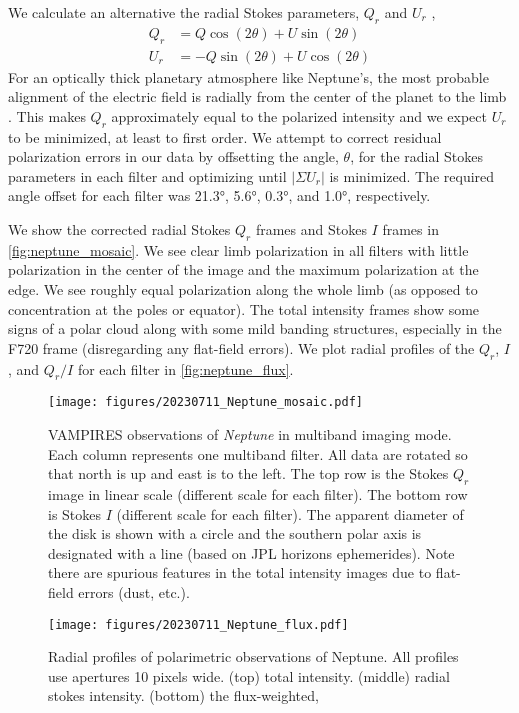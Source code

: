 We calculate an alternative the radial Stokes parameters, $Q_r$ and $U_r$ \citep{schmid_limb_2006},
\begin{align}
    Q_r &= Q\cos{\left(2\theta\right)} + U\sin{\left(2\theta\right)} \\
    U_r &= -Q\sin{\left(2\theta\right)} + U\cos{\left(2\theta\right)}
\end{align}
For an optically thick planetary atmosphere like Neptune's, the most probable alignment of the electric field is radially from the center of the planet to the limb \citep{schmid_limb_2006}. This makes $Q_r$ approximately equal to the polarized intensity and we expect $U_r$ to be minimized, at least to first order. We attempt to correct residual polarization errors in our data by offsetting the angle, $\theta$, for the radial Stokes parameters in each filter and optimizing until $|\Sigma{U_r}|$ is minimized. The required angle offset for each filter was \ang{21.3}, \ang{5.6}, \ang{0.3}, and \ang{1.0}, respectively.

We show the corrected radial Stokes $Q_r$ frames and Stokes $I$ frames in \autoref{fig:neptune_mosaic}. We see clear limb polarization in all filters with little polarization in the center of the image and the maximum polarization at the edge. We see roughly equal polarization along the whole limb (as opposed to concentration at the poles or equator). The total intensity frames show some signs of a polar cloud along with some mild banding structures, especially in the F720 frame (disregarding any flat-field errors). We plot radial profiles of the $Q_r$, $I$, and $Q_r/I$ for each filter in \autoref{fig:neptune_flux}.

\begin{figure*}[t]
    \centering
    \texttt{[image: figures/20230711\_Neptune\_mosaic.pdf]}
    \caption{ VAMPIRES observations of \textit{Neptune} in multiband imaging mode. Each column represents one multiband filter. All data are rotated so that north is up and east is to the left. The top row is the Stokes $Q_r$ image in linear scale (different scale for each filter). The bottom row is Stokes $I$ (different scale for each filter). The apparent diameter of the disk is shown with a circle and the southern polar axis is designated with a line (based on JPL horizons ephemerides). Note there are spurious features in the total intensity images due to flat-field errors (dust, etc.). \label{fig:neptune_mosaic}}
\end{figure*}

\begin{figure}[t]
    \centering
    \texttt{[image: figures/20230711\_Neptune\_flux.pdf]}
    \caption{Radial profiles of polarimetric observations of Neptune. All profiles use apertures 10 pixels wide. (top) total intensity. (middle) radial stokes intensity. (bottom) the flux-weighted, \label{fig:neptune_flux}}
\end{figure}
